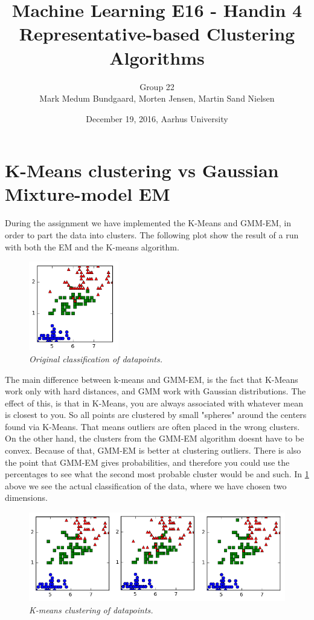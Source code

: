 \documentclass[a4paper,10pt,article,oneside,english]{memoir}
\let\oldcaption\caption
\renewcommand{\caption}[1]{\oldcaption{\emph{#1}}}
\begin{document}
	\title{Machine Learning E16 - Handin 4\\
		Representative-based Clustering Algorithms}
	\author{Group 22\\
		Mark Medum Bundgaard, Morten Jensen, Martin Sand Nielsen}
	\date{December 19, 2016, Aarhus University}
	
	\mainmatter
	\maketitle


\section*{K-Means clustering vs Gaussian Mixture-model EM}
During the assignment we have implemented the K-Means and GMM-EM, in order to part the data into clusters. The following plot show the result of a run with both the EM and the K-means algorithm.
\begin{figure}
	\centering
	\includegraphics[width=0.35\textwidth]{original.png}
	\caption{Original classification of datapoints.}
	\label{fig:orig}
\end{figure}
The main difference between k-means and GMM-EM, is the fact that K-Means work only with hard distances, and GMM work with Gaussian distributions. The effect of this, is that in K-Means, you are always associated with whatever mean is closest to you. So all points are clustered by small "spheres" around the centers found via K-Means. That means outliers are often placed in the wrong clusters. On the other hand, the clusters from the GMM-EM algorithm doesnt have to be convex. Because of that, GMM-EM is better at clustering outliers.
There is also the point that GMM-EM gives probabilities, and therefore you could use the percentages to see what the second most probable cluster would be and such.
In \ref{fig:orig} above we see the actual classification of the data, where we have chosen two dimensions.
\begin{figure}
	\centering
	\includegraphics[width=\textwidth]{kmeans1.png}
	\caption{K-means clustering of datapoints.}
	\label{fig:km}
\end{figure}
\end{document}
